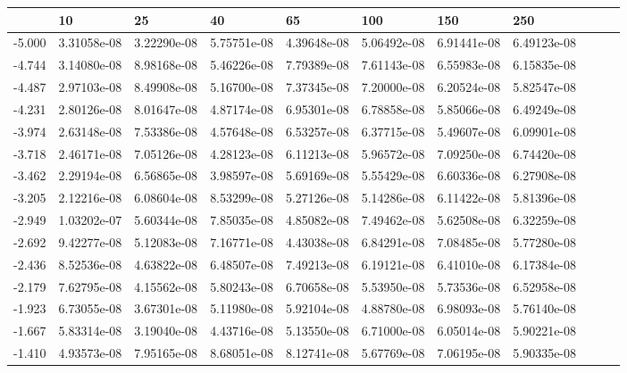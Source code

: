 \documentclass{article}
\begin{document}
\begin{table}[H]
\centering
\begin{adjustwidth}{-0.9in}{-.7in} 
\begin{tabular}{|l|l|l|l|l|l|l|l|l|l|l|}
\hline
& 10 & 25 & 40 & 65 & 100 & 150 & 250 \\ \hline
-5.000 & 3.31058e-08 & 3.22290e-08 & 5.75751e-08 & 4.39648e-08 & 5.06492e-08 & 6.91441e-08 & 6.49123e-08 \\ \hline
-4.744 & 3.14080e-08 & 8.98168e-08 & 5.46226e-08 & 7.79389e-08 & 7.61143e-08 & 6.55983e-08 & 6.15835e-08 \\ \hline
-4.487 & 2.97103e-08 & 8.49908e-08 & 5.16700e-08 & 7.37345e-08 & 7.20000e-08 & 6.20524e-08 & 5.82547e-08 \\ \hline
-4.231 & 2.80126e-08 & 8.01647e-08 & 4.87174e-08 & 6.95301e-08 & 6.78858e-08 & 5.85066e-08 & 6.49249e-08 \\ \hline
-3.974 & 2.63148e-08 & 7.53386e-08 & 4.57648e-08 & 6.53257e-08 & 6.37715e-08 & 5.49607e-08 & 6.09901e-08 \\ \hline
-3.718 & 2.46171e-08 & 7.05126e-08 & 4.28123e-08 & 6.11213e-08 & 5.96572e-08 & 7.09250e-08 & 6.74420e-08 \\ \hline
-3.462 & 2.29194e-08 & 6.56865e-08 & 3.98597e-08 & 5.69169e-08 & 5.55429e-08 & 6.60336e-08 & 6.27908e-08 \\ \hline
-3.205 & 2.12216e-08 & 6.08604e-08 & 8.53299e-08 & 5.27126e-08 & 5.14286e-08 & 6.11422e-08 & 5.81396e-08 \\ \hline
-2.949 & 1.03202e-07 & 5.60344e-08 & 7.85035e-08 & 4.85082e-08 & 7.49462e-08 & 5.62508e-08 & 6.32259e-08 \\ \hline
-2.692 & 9.42277e-08 & 5.12083e-08 & 7.16771e-08 & 4.43038e-08 & 6.84291e-08 & 7.08485e-08 & 5.77280e-08 \\ \hline
-2.436 & 8.52536e-08 & 4.63822e-08 & 6.48507e-08 & 7.49213e-08 & 6.19121e-08 & 6.41010e-08 & 6.17384e-08 \\ \hline
-2.179 & 7.62795e-08 & 4.15562e-08 & 5.80243e-08 & 6.70658e-08 & 5.53950e-08 & 5.73536e-08 & 6.52958e-08 \\ \hline
-1.923 & 6.73055e-08 & 3.67301e-08 & 5.11980e-08 & 5.92104e-08 & 4.88780e-08 & 6.98093e-08 & 5.76140e-08 \\ \hline
-1.667 & 5.83314e-08 & 3.19040e-08 & 4.43716e-08 & 5.13550e-08 & 6.71000e-08 & 6.05014e-08 & 5.90221e-08 \\ \hline
-1.410 & 4.93573e-08 & 7.95165e-08 & 8.68051e-08 & 8.12741e-08 & 5.67769e-08 & 7.06195e-08 & 5.90335e-08 \\ \hline

\end{tabular}
\end{adjustwidth}
\end{table}
\end{document}

